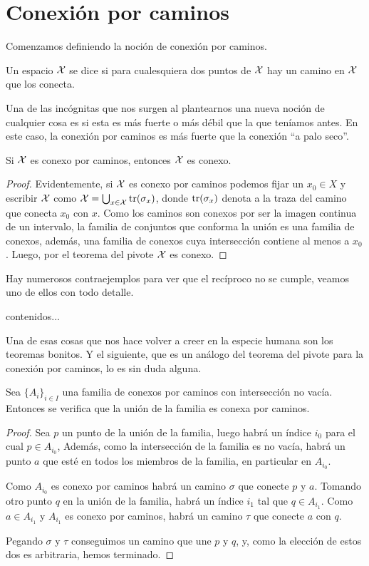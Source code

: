 \section{Conexión por caminos}
Comenzamos definiendo la noción de conexión por caminos.
\begin{defi}
	Un espacio $\mathcal{X}$ se dice  si para cualesquiera dos puntos de $\mathcal{X}$ hay un camino en $\mathcal{X}$ que los conecta.
\end{defi}
Una de las incógnitas que nos surgen al plantearnos una nueva noción de cualquier cosa es si esta es más fuerte o más débil que la que teníamos antes. En este caso, la conexión por caminos es más fuerte que la conexión ``a palo seco''.
\begin{prop}
	Si $\mathcal{X}$ es conexo por caminos, entonces $\mathcal{X}$ es conexo.
\end{prop}
\begin{proof}
	Evidentemente, si $\mathcal{X}$ es conexo por caminos podemos fijar un $x_0\in X$ y escribir $\mathcal{X}$ como $\mathcal{X}=\bigcup_{x\in\mathcal{X}}\operatorname{\mathrm{tr}}(\sigma_x)$, donde $\operatorname{\mathrm{tr}}(\sigma_x)$ denota a la traza del camino que conecta $x_0$ con $x$. Como los caminos son conexos por ser la imagen continua de un intervalo, la familia de conjuntos que conforma la unión es una familia de conexos, además, una familia de conexos cuya intersección contiene al menos a $x_0$. Luego, por el teorema del pivote $\mathcal{X}$ es conexo.
\end{proof}
Hay numerosos contraejemplos para ver que el recíproco no se cumple, veamos uno de ellos con todo detalle.
\begin{exa}
	contenidos...
\end{exa}
Una de esas cosas que nos hace volver a creer en la especie humana son los teoremas bonitos. Y el siguiente, que es un análogo del teorema del pivote para la conexión por caminos, lo es sin duda alguna.
\begin{theo}
	Sea $\{A_i\}_{i\in I}$ una familia de conexos por caminos con intersección no vacía. Entonces se verifica que la unión de la familia es conexa por caminos.
\end{theo}
\begin{proof}
	Sea $p$ un punto de la unión de la familia, luego habrá un índice $i_0$ para el cual $p\in A_{i_0}$, Además, como la intersección de la familia es no vacía, habrá un punto $a$ que esté en todos los miembros de la familia, en particular en $A_{i_0}$.
	
	Como $A_{i_0}$ es conexo por caminos habrá un camino $\sigma$ que conecte $p$ y $a$. Tomando otro punto $q$ en la unión de la familia, habrá un índice $i_1$ tal que $q\in A_{i_1}$. Como $a\in A_{i_1}$ y $A_{i_1}$ es conexo por caminos, habrá un camino $\tau$ que conecte $a$ con $q$.
	
	Pegando $\sigma$ y $\tau$ conseguimos un camino que une $p$ y $q$, y, como la elección de estos dos es arbitraria, hemos terminado.
\end{proof}
